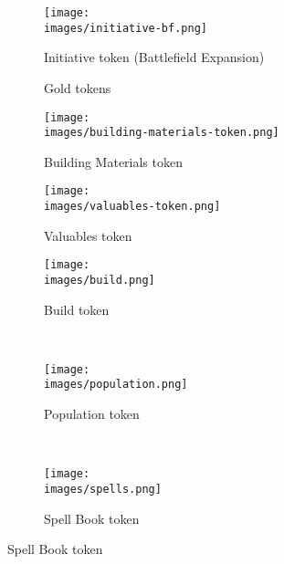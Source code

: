 \begin{figure}[H]
  \centering
  \hspace*{-1em}
  \begin{subfigure}[b]{0.15\linewidth}
    \centering
    \texttt{[image: \\images/initiative-bf.png]}
    \caption{\centering Initiative token (Battlefield Expansion)}
  \end{subfigure}
  \hspace*{-1em}
  \begin{subfigure}[b]{0.2\linewidth}
    \caption{\centering Gold tokens \phantom{Population} \phantom{Population}}
  \end{subfigure}
  \begin{subfigure}[b]{0.11\linewidth}
    \centering
    \texttt{[image: \\images/building-materials-token.png]}
    \caption{\centering Building Materials token}
  \end{subfigure}
  \begin{subfigure}[b]{0.11\linewidth}
    \centering
    \texttt{[image: \\images/valuables-token.png]}
    \caption{\centering Valuables token \phantom{Population}}
  \end{subfigure}
  \begin{subfigure}[b]{0.12\linewidth}
    \texttt{[image: \\images/build.png]}
    \caption{\centering Build token \phantom{Population} \phantom{Population}}
  \end{subfigure}
  ~
  \begin{subfigure}[b]{0.12\linewidth}
    \texttt{[image: \\images/population.png]}
    \caption{\centering Population token \phantom{Population}}
  \end{subfigure}
  ~
  \begin{subfigure}[b]{0.12\linewidth}
    \texttt{[image: \\images/spells.png]}
    \caption{\centering Spell Book token \phantom{Population}}
  \end{subfigure}
\end{figure}
\vspace*{-3em}

